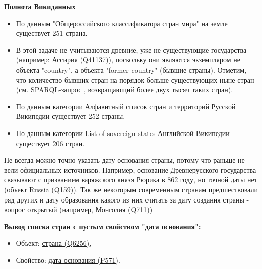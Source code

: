 \textbf{Полнота Викиданных}
\begin{itemize}
    \item По данным "Общероссийского классификатора стран мира" на земле существует 251 страна.

    \item В этой задаче не учитываются древние, уже не существующие государства (например: \href{https://www.wikidata.org/wiki/Q41137}{Ассирия (Q41137)}), поскольку они являются экземпляром не объекта "country", а объекта "former country" (бывшие страны). Отметим, что количество бывших стран на порядок больше существующих ныне стран (см. \href{https://query.wikidata.org/#SELECT%20%3Fitem%20%3Flabel%20%3F_image%20WHERE%20%7B%0A%20%20%3Fitem%20wdt%3AP31%20wd%3AQ3024240.%0A%20%20SERVICE%20wikibase%3Alabel%20%7B%0A%20%20%20%20bd%3AserviceParam%20wikibase%3Alanguage%20%22en%22%20.%20%0A%20%20%20%20%3Fitem%20rdfs%3Alabel%20%3Flabel%0A%20%20%7D%0A%20%20%0AOPTIONAL%20%7B%20%3Fitem%20wdt%3AP18%20%3F_image.%20%7D%0A%7D%0A}{SPARQL-запрос} , возвращающий более двух тысяч таких стран).

    \item По данным категории \href{https://ru.wikipedia.org/wiki/%D0%90%D0%BB%D1%84%D0%B0%D0%B2%D0%B8%D1%82%D0%BD%D1%8B%D0%B9_%D1%81%D0%BF%D0%B8%D1%81%D0%BE%D0%BA_%D1%81%D1%82%D1%80%D0%B0%D0%BD_%D0%B8_%D1%82%D0%B5%D1%80%D1%80%D0%B8%D1%82%D0%BE%D1%80%D0%B8%D0%B9}{Алфавитный список стран и территорий} Русской Википедии существует  252  страны.

    \item По данным категории \href{https://www.wikipedia.org/wiki/en:List_of_sovereign_states}{List of sovereign states} Английской Википедии существует 206 стран.
    \end{itemize}

Не всегда можно точно указать дату основания страны, потому что раньше не вели официальных источников. Например, основание Древнерусского государства связывают с призванием варяжского князя Рюрика в 862 году, но точной даты нет (объект \href{https://www.wikidata.org/wiki/Q159} {Russia (Q159)}). Так же некоторым современным странам предшествовали ряд других и дату образования какого из них считать за дату создания страны - вопрос открытый (например, \href{https://www.wikidata.org/wiki/Q711}{Монголия (Q711)})


\textbf{Вывод списка стран с пустым свойством "дата основания":}

\begin{itemize}
    \item Объект: \href{https://www.wikidata.org/wiki/Q6256}{страна (Q6256)},
    \item Свойство: \href{https://www.wikidata.org/wiki/Property:P571}{дата основания (P571)}.
\end{itemize}

